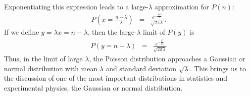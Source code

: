 \documentclass{revtex4}
\begin{document}
Exponentiating this expression leads to a large-$\lambda$
approximation for $P(n)$:
\begin{eqnarray}
  P\left(x = \frac{n-\lambda}{\lambda}\right) &=& \frac{e^{-\frac{\lambda
        x^2}{2}}}{\sqrt{2\pi \lambda}}.
\end{eqnarray}
If we define $y = \lambda x = n - \lambda$, then the large-$\lambda$ limit
of $P(y)$ is 
\begin{eqnarray}
  P(y = n - \lambda) &=& \frac{e^{-\frac{y^2}{2\lambda}}}{\sqrt{2\pi \lambda}}
\end{eqnarray}
Thus, in the limit of large $\lambda$, the Poisson distribution
approaches a Gaussian or normal distribution with mean $\lambda$
and standard deviation $\sqrt{\lambda}$. This brings us to the
discussion of one of the most important distributions in statistics
and experimental physics, the Gaussian or normal distribution.
\end{document}
